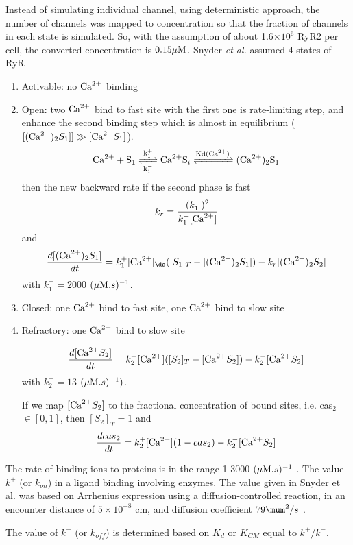Instead of simulating individual channel, using deterministic approach, the
number of channels was mapped to concentration so that the fraction of channels
in each state is simulated. So, with the assumption of about 1.6$\times 10^6$
RyR2 per cell, the converted concentration is $0.15{\mu\text{M}}$.
Snyder {\it et al.} assumed 4 states of RyR
\begin{enumerate}
  \item Activable: no ${\text{Ca}^{2+}}$ binding
  \item Open: two ${\text{Ca}^{2+}}$ bind to fast site with the first one is rate-limiting
  step, and enhance the second binding step which is almost in equilibrium
  ($[({\text{Ca}^{2+}})_2 S_1]]\gg [{\text{Ca}^{2+}} S_1]$).
\begin{equation}
\ce{Ca^2+ + S_1 <=>[k^+_1][k^-_1] Ca^2+S_i <=>[Kd(\Ca)] (Ca^2+)_2S_1 }
\end{equation}
then the new backward rate if the second phase is fast
\begin{equation}
k_r = \frac{(k^-_1)^2}{k^+_1[{\text{Ca}^{2+}}]}
\end{equation}
and
\begin{equation}
\frac{d[(\Ca)_2 S_1]}{dt} = k^+_1 [\Ca]_\ds ([S_1]_T - [(\Ca)_2 S_1]) - k_r
 [(\Ca)_2 S_2]
\end{equation}
with $k^+_1 = 2000$ $({\mu\text{M}}.s)^{-1}$.


  \item Closed: one ${\text{Ca}^{2+}}$ bind to fast site, one ${\text{Ca}^{2+}}$ bind to slow site

  \item Refractory: one ${\text{Ca}^{2+}}$ bind to slow site

\begin{equation}
\frac{d[{\text{Ca}^{2+}} S_2]}{dt} = k^+_2 [{\text{Ca}^{2+}}]([S_2]_T - [{\text{Ca}^{2+}} S_2]) - k^-_2 [{\text{Ca}^{2+}} S_2]
\end{equation}
with $k^+_2 = 13$ $({\mu\text{M}}.s)^{-1})$.

If we map $[{\text{Ca}^{2+}} S_2]$ to the fractional concentration of bound sites, i.e.
cas$_2$ $\in [0,1]$, then $[S_2]_T = 1$ and
\begin{equation}
\frac{dcas_2}{dt} = k^+_2 [{\text{Ca}^{2+}}] (1 - cas_2) - k^-_2 [{\text{Ca}^{2+}} S_2]
\end{equation}
\end{enumerate}

\begin{framed}
The rate of binding ions to proteins is in the range 1-3000 $({\mu\text{M}}.s)^{-1}$
\citep{Moore1984}.  The value $k^+$ (or $k_{on}$) in a ligand binding involving
enzymes. The value given in Snyder et al. was based on Arrhenius expression
using a diffusion-controlled reaction, in an encounter distance of $5\times
10^{-8}$ cm, and diffusion coefficient $79 \mum^2/s$ \citep{marcus1997}.

The value of $k^-$ (or $k_{off}$) is determined based on $K_d$ or $K_{CM}$ equal
to $k^+/k^-$.
\end{framed}

